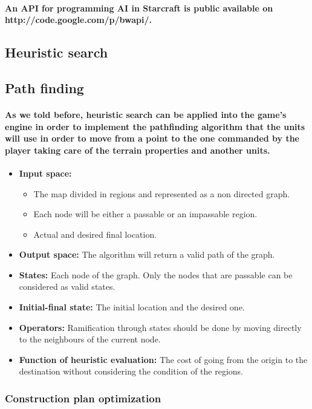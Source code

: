 \documentclass[a4paper,10pt]{article}
\newcommand{\p}[1]{\paragraph{\indent\textnormal{#1}}}
\begin{document}
      \p{An API for programming AI in Starcraft is public available on http://code.google.com/p/bwapi/.}

\subsection{Heuristic search}

	  \subsection{Path finding}

	    \p{As we told before, heuristic search can be applied into the game's engine in order to implement the pathfinding algorithm that the units will use in order to move from a point to the one commanded by the player taking care of the terrain properties and another units.}

		  \begin{itemize}
		  \item \textbf{Input space:}
		    \begin{itemize}
			\item The map divided in regions and represented as a non directed graph.
			\item Each node will be either a passable or an impassable region.
			\item Actual and desired final location.
		    \end{itemize}
		  \item \textbf{Output space:} The algorithm will return a valid path of the graph.
		  \item \textbf{States:} Each node of the graph. Only the nodes that are passable can be considered as valid states. 
		  \item \textbf{Initial-final state:} The initial location and the desired one.
		  \item \textbf{Operators:} Ramification through states should be done by moving directly to the neighbours of the current node.
		  \item \textbf{Function of heuristic evaluation:} The cost of going from the origin to the destination without considering the condition of the regions.
		  \end{itemize}

	    \subsubsection{Construction plan optimization}
	    
\end{document}

